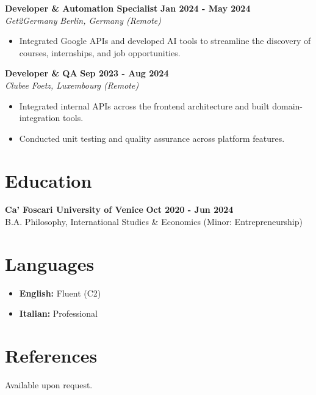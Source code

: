 \documentclass[10pt, a4paper]{article}
\begin{document}
\textbf{Developer \& Automation Specialist} \hfill \textbf{Jan 2024 - May 2024} \\
\textit{Get2Germany} \hfill \textit{Berlin, Germany (Remote)}
\begin{itemize}[leftmargin=*, noitemsep]
    \item Integrated Google APIs and developed AI tools to streamline the discovery of courses, internships, and job opportunities.
\end{itemize}

\textbf{Developer \& QA} \hfill \textbf{Sep 2023 - Aug 2024} \\
\textit{Clubee} \hfill \textit{Foetz, Luxembourg (Remote)}
\begin{itemize}[leftmargin=*, noitemsep]
    \item Integrated internal APIs across the frontend architecture and built domain-integration tools.
    \item Conducted unit testing and quality assurance across platform features.
\end{itemize}

\section{Education}
\textbf{Ca' Foscari University of Venice} \hfill \textbf{Oct 2020 - Jun 2024} \\
B.A. Philosophy, International Studies \& Economics (Minor: Entrepreneurship)

\section{Languages}
\begin{itemize}[leftmargin=*, noitemsep]
    \item \textbf{English:} Fluent (C2)
    \item \textbf{Italian:} Professional
\end{itemize}

\section{References}
Available upon request.
\end{document}

